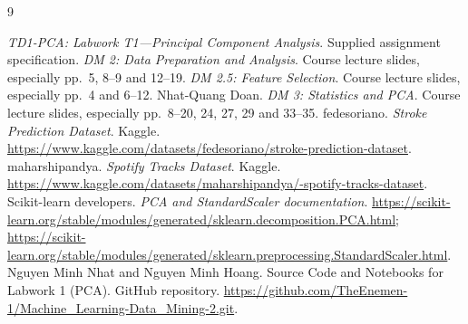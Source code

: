 \documentclass[12pt, a4paper]{article}
\begin{document}
\clearpage
\begin{thebibliography}{9}
\raggedright
{} \textit{TD1-PCA: Labwork T1---Principal Component Analysis}. Supplied assignment specification.
 \textit{DM 2: Data Preparation and Analysis}. Course lecture slides, especially pp.~5, 8--9 and 12--19.
 \textit{DM 2.5: Feature Selection}. Course lecture slides, especially pp.~4 and 6--12.
 Nhat-Quang Doan. \textit{DM 3: Statistics and PCA}. Course lecture slides, especially pp.~8--20, 24, 27, 29 and 33--35.
 fedesoriano. \textit{Stroke Prediction Dataset}. Kaggle. \url{https://www.kaggle.com/datasets/fedesoriano/stroke-prediction-dataset}.
 maharshipandya. \textit{Spotify Tracks Dataset}. Kaggle. \url{https://www.kaggle.com/datasets/maharshipandya/-spotify-tracks-dataset}.
 Scikit-learn developers. \textit{PCA and StandardScaler documentation}. \url{https://scikit-learn.org/stable/modules/generated/sklearn.decomposition.PCA.html}; \url{https://scikit-learn.org/stable/modules/generated/sklearn.preprocessing.StandardScaler.html}.
 Nguyen Minh Nhat and Nguyen Minh Hoang. Source Code and Notebooks for Labwork 1 (PCA). GitHub repository. \url{https://github.com/TheEnemen-1/Machine_Learning-Data_Mining-2.git}.
\end{thebibliography}
\end{document}
